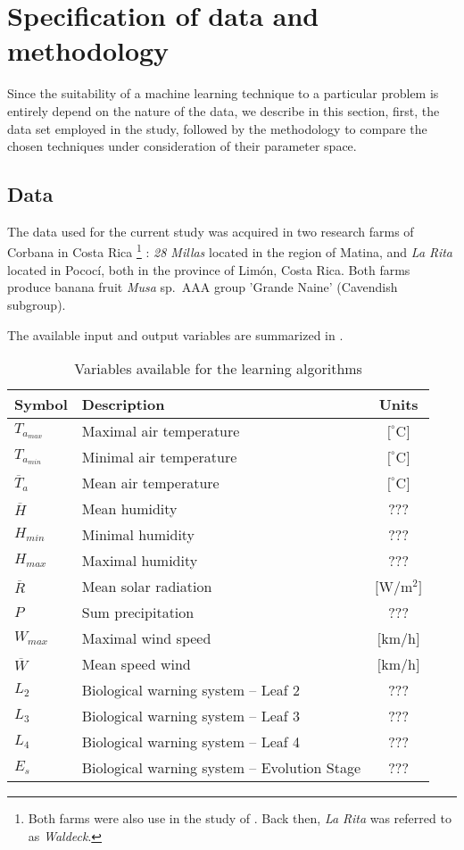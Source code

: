 \section{Specification of data and methodology}
\label{sec:data}

Since the suitability of a machine learning technique to a particular
problem is entirely depend on the nature of the data, we describe in
this section, first, the data set employed in the study, followed by
the methodology to compare the chosen techniques under consideration
of their parameter space.

\subsection{Data}

The data used for the current study was acquired in two research farms
of Corbana in Costa Rica%
%
\footnote{Both farms were also use in the study of \citet{Romero1995}.  Back
  then, \emph{La Rita} was referred to as \emph{Waldeck}.}
%
: \emph{28 Millas} located in the region of Matina, and \emph{La Rita}
located in Pococí, both in the province of Limón, Costa Rica.
%
Both farms produce banana fruit \emph{Musa} sp.\ AAA group 'Grande
Naine' (Cavendish subgroup).

The available input and output variables are summarized in
.
%
\begin{table}[h] 
\centering
\begin{tabular}{l|l|c} 
\hline
\textbf{Symbol}  & \textbf{Description} & \textbf{Units} \\ 
\hline\hline 
$T_{a_{max}}$       & Maximal air temperature & $[^\circ$C$]$ \\
$T_{a_{min}}$       & Minimal air temperature & $[^\circ$C$]$ \\
$\overline{T}_{a}$ & Mean air temperature    & $[^\circ$C$]$ \\
$\overline{H}$    & Mean humidity           & ???  \\
$H_{min}$          & Minimal humidity        & ???  \\
$H_{max}$          & Maximal humidity        & ???  \\
$\overline{R}$    & Mean solar radiation    & $[$W/m$^2$$]$ \\
$P$               & Sum precipitation       & ??? \\
$W_{max}$          & Maximal wind speed      & $[$km/h$]$ \\
$\overline{W}$    & Mean speed wind         & $[$km/h$]$ \\
$L_2$             & Biological warning system – Leaf 2 & ???\\
$L_3$             & Biological warning system – Leaf 3 & ???\\
$L_4$             & Biological warning system – Leaf 4 & ???\\
\hline
$E_s$             & Biological warning system – Evolution Stage  & ???\\
\hline
\end{tabular} 
\caption{Variables available for the learning algorithms} 
\label{tab:variables} 
\end{table}

